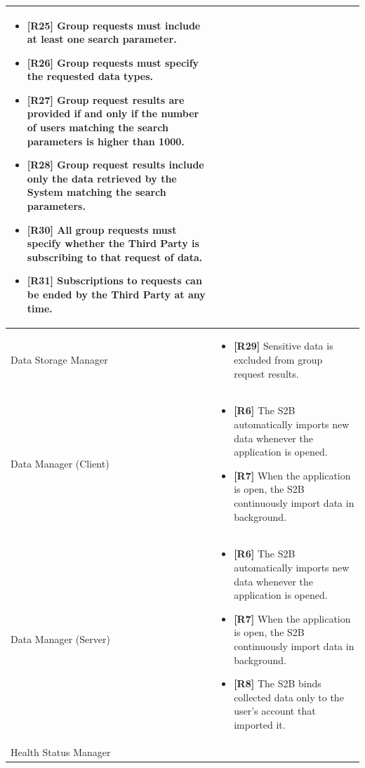 \documentclass[titlepage]{article}
\begin{document}
\begin{longtable}{| p{5 cm} | p{8 cm} |}
\begin{itemize}
			\item {\bf [R25]} Group requests must include at least one search parameter. 
			\item {\bf [R26]} Group requests must specify the requested data types. 
			\item {\bf [R27]} Group request results are provided if and only if the number of users matching the search parameters is higher than 1000. 
			\item {\bf [R28]} Group request results include only the data retrieved by the System matching the search parameters. 
			\item {\bf [R30]} All group requests must specify whether the Third Party is subscribing to that request of data. 
			\item {\bf [R31]} Subscriptions to requests can be ended by the Third Party at any time.
		\end{itemize}		
		\\	 \hline
		\newline Data Storage Manager & 
		\begin{itemize}
			\item {\bf [R29]} Sensitive data is excluded from group request results. 
		\end{itemize}		
		\\	 \hline	
		\newline Data Manager (Client) & 
		\begin{itemize}
			\item {\bf [R6]} The S2B automatically imports new data whenever the application is opened.
			\item {\bf [R7]} When the application is open, the S2B continuously import data in background.
		\end{itemize}		
		\\	 \hline	
		\newline Data Manager (Server) & 
		\begin{itemize}
			\item {\bf [R6]} The S2B automatically imports new data whenever the application is opened.
			\item {\bf [R7]} When the application is open, the S2B continuously import data in background.
			\item {\bf [R8]} The S2B binds collected data only to the user’s account that imported it. 
		\end{itemize}		
		\\	 \hline	
		\newline Health Status Manager & 
		\begin{itemize}

\end{itemize}
\end{longtable}
\end{document}
